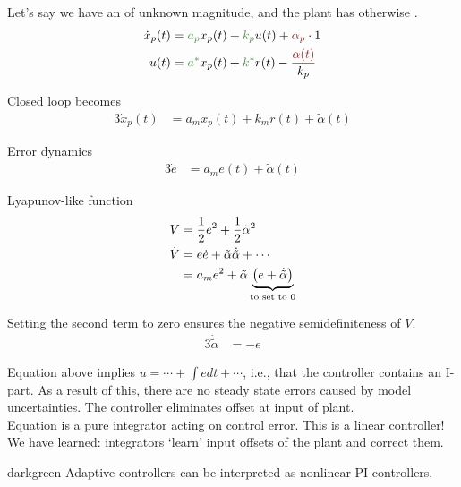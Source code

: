 Let's say we have an  of unknown magnitude,
and the plant has otherwise .
\begin{alignat*}{3}
\dot{x}_p(t) &= \knownVar{a_p} x_p(t) + \knownVar{k_p} u(t) + \unknownVar{\alpha_p} \cdot 1\\
u(t) &= \knownVar{a^*} x_p(t) + \knownVar{k^*} r(t) - \frac{ \unknownVar{\alpha(t)}}{k_p}
\end{alignat*}

Closed loop becomes
\begin{alignat*}{3}
\dot{x}_p(t) &= a_m x_p(t) + k_m r(t) + \tilde{\alpha}(t)
\end{alignat*} 

Error dynamics
\begin{alignat*}{3}
\dot{e} &= a_m e(t) + \tilde{\alpha}(t)
\end{alignat*}

Lyapunov-like function
\begin{alignat*}{3}
V &= \frac{1}{2} e^2 + \frac{1}{2} \tilde{\alpha}^2\\
\dot{V} &= e \dot{e} + \tilde{\alpha} \dot{ \tilde{\alpha}} + \cdots\\
    &= a_me^2 + \tilde{\alpha} \underbrace{\left( e + \dot{ \tilde{\alpha}} \right)}_{\textnormal{to set to 0}}
\end{alignat*}

Setting the second term to zero ensures the negative
semi\-definite\-ness of $\dot{V}$.
\begin{alignat}{3}
\dot{ \tilde{\alpha}} &= -e \label{eq:integral-error}
\end{alignat}

Equation  above implies
$u = \cdots + \int e dt + \cdots$, i.e.,
that the controller contains an I-part.
As a result of this, there are no steady state errors
caused by model uncertainties.
The controller eliminates offset at input of plant.\\

Equation  is a pure integrator
acting on control error. This is a linear controller!
We have learned: integrators `learn' input offsets of
the plant and correct them.\\

\begin{conclusion}{darkgreen}
Adaptive controllers can be interpreted as nonlinear
PI controllers.
\end{conclusion}
